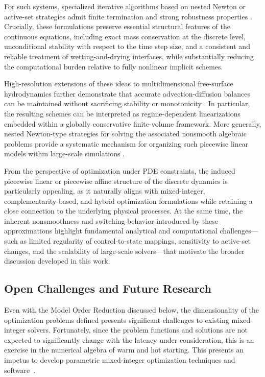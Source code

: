 \documentclass{article}
\newcommand{\1}{\mathds{1}}          %
\theoremstyle{definition}
\begin{document}
\begin{sloppypar}
For such systems, specialized iterative algorithms based on nested Newton or active-set strategies admit finite termination and strong robustness properties \cite{BrugnanoCasulli2008,BrugnanoCasulli2009}. Crucially, these formulations preserve essential structural features of the continuous equations, including exact mass conservation at the discrete level, unconditional stability with respect to the time step size, and a consistent and reliable treatment of wetting-and-drying interfaces, while substantially reducing the computational burden relative to fully nonlinear implicit schemes.

High-resolution extensions of these ideas to multidimensional free-surface hydrodynamics further demonstrate that accurate advection-diffusion balances can be maintained without sacrificing stability or monotonicity \cite{CASULLIZANOLLI2007}. In particular, the resulting schemes can be interpreted as regime-dependent linearizations embedded within a globally conservative finite-volume framework. More generally, nested Newton-type strategies for solving the associated nonsmooth algebraic problems provide a systematic mechanism for organizing such piecewise linear models within large-scale simulations \cite{CasulliZanolli2010}.

From the perspective of optimization under PDE constraints, the induced piecewise linear or piecewise affine structure of the discrete dynamics is particularly appealing, as it naturally aligns with mixed-integer, complementarity-based, and hybrid optimization formulations while retaining a close connection to the underlying physical processes. At the same time, the inherent nonsmoothness and switching behavior introduced by these approximations highlight fundamental analytical and computational challenges—such as limited regularity of control-to-state mappings, sensitivity to active-set changes, and the scalability of large-scale solvers—that motivate the broader discussion developed in this work.


\subsection{Open Challenges and Future Research}
Even with the Model Order Reduction discussed below, the dimensionality of the optimization problems defined presents significant challenges to existing mixed-integer solvers. Fortunately, since the problem functions and solutions are not expected to significantly change with the latency under consideration, this is an exercise in the numerical algebra of warm and hot starting. This presents an impetus to develop parametric mixed-integer optimization techniques and software~\cite{bank2021parametric}.




\end{sloppypar}
\end{document}
